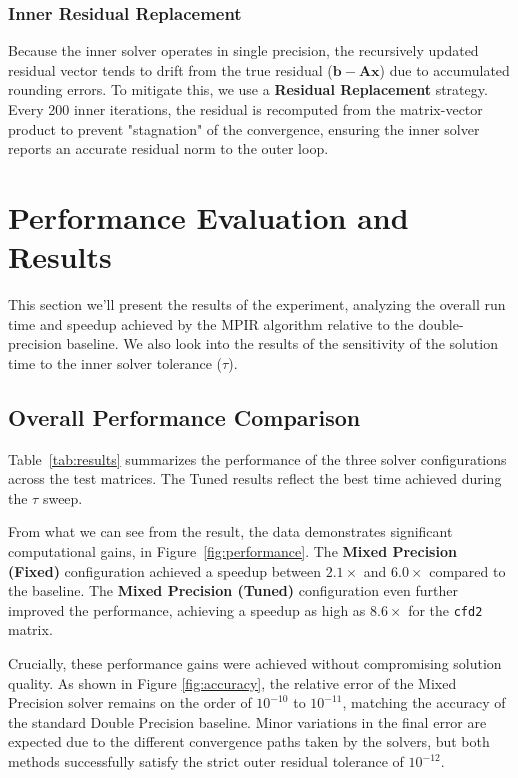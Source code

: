 \documentclass[a4paper,10.5pt,twoside]{article}
\begin{document}
\subsubsection{Inner Residual Replacement}
Because the inner solver operates in single precision, the recursively updated residual vector tends to drift from the true residual ($\mathbf{b} - \mathbf{A}\mathbf{x}$) due to accumulated rounding errors. To mitigate this, we  use a \textbf{Residual Replacement} strategy. Every 200 inner iterations, the residual is recomputed from the matrix-vector product to prevent "stagnation" of the convergence, ensuring the inner solver reports an accurate residual norm to the outer loop.



\section{Performance Evaluation and Results}\label{s:2.1}
This section we'll present the results of the experiment, analyzing the overall run time and speedup achieved by the MPIR algorithm relative to the double-precision baseline. We also look into the results of the sensitivity of the solution time to the inner solver tolerance ($\tau$).

\subsection{Overall Performance Comparison}

Table~\ref{tab:results} summarizes the performance of the three solver configurations across the test matrices. The Tuned results reflect the best time achieved during the $\tau$ sweep.

From what we can see from the result, the data demonstrates significant computational gains, in Figure~\ref{fig:performance}. The \textbf{Mixed Precision (Fixed)} configuration achieved a speedup between $2.1\times$ and $6.0\times$ compared to the baseline. The \textbf{Mixed Precision (Tuned)} configuration even further improved the performance, achieving a speedup as high as $8.6\times$ for the \texttt{cfd2} matrix.

Crucially, these performance gains were achieved without compromising solution quality. As shown in Figure \ref{fig:accuracy}, the relative error of the Mixed Precision solver remains on the order of $10^{-10}$ to $10^{-11}$, matching the accuracy of the standard Double Precision baseline. Minor variations in the final error are expected due to the different convergence paths taken by the solvers, but both methods successfully satisfy the strict outer residual tolerance of $10^{-12}$.
\end{document}
